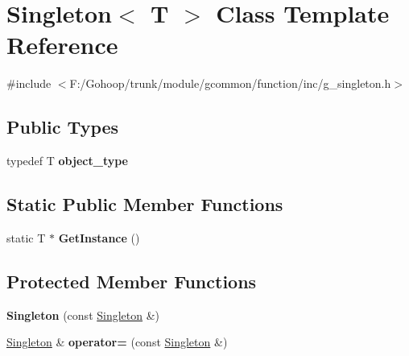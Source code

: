 \hypertarget{class_singleton}{\section{Singleton$<$ T $>$ Class Template Reference}
\label{class_singleton}
}


{\ttfamily \#include $<$F\-:/\-Gohoop/trunk/module/gcommon/function/inc/g\-\_\-singleton.\-h$>$}

\subsection*{Public Types}
\begin{DoxyCompactItemize}
\item 
\hypertarget{class_singleton_ad326148a1526a06a30fb8337e7f9e6ca}{typedef T {\bfseries object\-\_\-type}}\label{class_singleton_ad326148a1526a06a30fb8337e7f9e6ca}

\end{DoxyCompactItemize}
\subsection*{Static Public Member Functions}
\begin{DoxyCompactItemize}
\item 
\hypertarget{class_singleton_aa3e375e30b25a0443eaacbfb4078ccbd}{static T $\ast$ {\bfseries Get\-Instance} ()}\label{class_singleton_aa3e375e30b25a0443eaacbfb4078ccbd}

\end{DoxyCompactItemize}
\subsection*{Protected Member Functions}
\begin{DoxyCompactItemize}
\item 
\hypertarget{class_singleton_a363d3f7d5276e6ee74966d9606df2086}{{\bfseries Singleton} (const \hyperlink{class_singleton}{Singleton} \&)}\label{class_singleton_a363d3f7d5276e6ee74966d9606df2086}

\item 
\hypertarget{class_singleton_a90761b9486d76162ab59c871b5cc030f}{\hyperlink{class_singleton}{Singleton} \& {\bfseries operator=} (const \hyperlink{class_singleton}{Singleton} \&)}\label{class_singleton_a90761b9486d76162ab59c871b5cc030f}

\end{DoxyCompactItemize}


